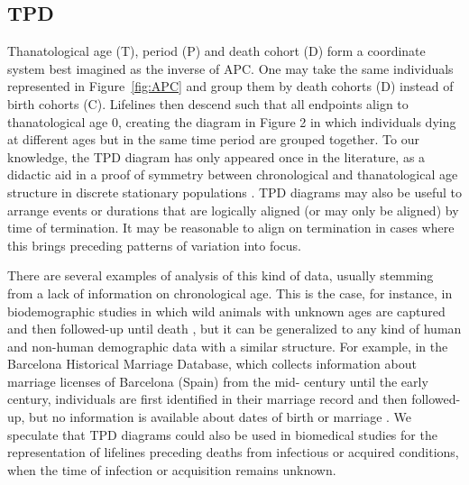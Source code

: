 \documentclass[12pt,oneside,a4paper]{article} %
\newcommand\tgh[1]{\raisebox{-.25\height}{\texttt{[image: Figures/triadtable/triad\#1.pdf]}}}
\begin{document}
\FloatBarrier
\subsection{TPD}%

Thanatological age (T), period (P) and death cohort (D) form a coordinate system
best imagined as the inverse of APC. One may take the same individuals
represented in Figure~\ref{fig:APC} and group them by death cohorts (D) instead
of birth cohorts (C). Lifelines then descend such that all
endpoints align to thanatological age 0, creating the diagram in Figure 2 in which individuals dying at different ages but in the same time period are grouped together.
To our knowledge, the TPD diagram has only appeared once in the literature, as
a didactic aid in a proof of symmetry between chronological and thanatological
age structure in discrete stationary populations \citep{pancho2016}. TPD
diagrams may also be useful to arrange events or durations that are logically
aligned (or may only be aligned) by time of termination. It may be reasonable to
align on termination in cases where this brings preceding patterns of
variation into focus.

There are several examples of analysis of this kind of
data, usually stemming from a lack of information on chronological age. This is
the case, for instance, in biodemographic studies in which wild animals with unknown
ages are captured and then followed-up until death
\citep{Muller2004,Muller2007}, but it can be generalized to any kind of human
and non-human demographic data with a similar structure. For example, in the
Barcelona Historical Marriage Database, which collects information about
marriage licenses of Barcelona (Spain) from the mid- century until the
early  century, individuals are first identified in their marriage
record and then followed-up, but no information is available about dates of
birth or marriage \citep{villavicencio2015lifespans}.
We speculate that TPD diagrams could also be used in biomedical studies
for the representation of lifelines preceding deaths from infectious or acquired conditions, when the time of infection or acquisition remains unknown.
\end{document}
